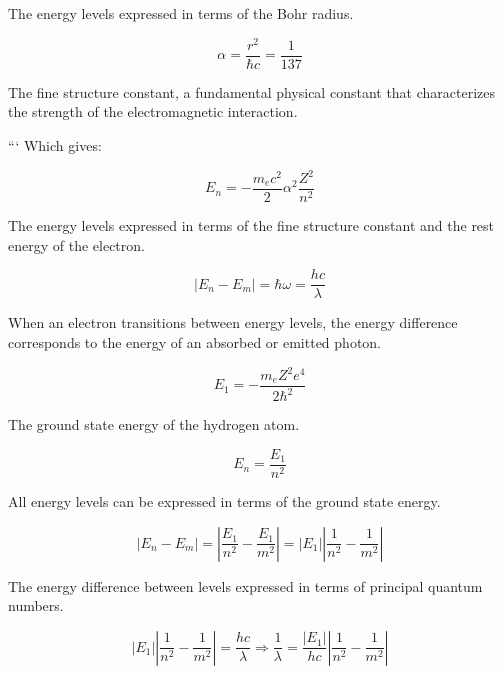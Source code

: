 \documentclass[10pt]{article}
\begin{document}
The energy levels expressed in terms of the Bohr radius.

\begin{equation*}
\alpha=\frac{r^{2}}{\hbar c}=\frac{1}{137} \tag{9.87}
\end{equation*}

The fine structure constant, a fundamental physical constant that characterizes the strength of the electromagnetic interaction.

```
Which gives:

\begin{equation*}
E_{n}=-\frac{m_{e} c^{2}}{2} \alpha^{2} \frac{Z^{2}}{n^{2}} \tag{9.88}
\end{equation*}

The energy levels expressed in terms of the fine structure constant and the rest energy of the electron.

\begin{equation*}
\left|E_{n}-E_{m}\right|=\hbar \omega=\frac{h c}{\lambda} \tag{9.89}
\end{equation*}

When an electron transitions between energy levels, the energy difference corresponds to the energy of an absorbed or emitted photon.

\begin{equation*}
E_{1}=-\frac{m_{e} Z^{2} e^{4}}{2 \hbar^{2}} \tag{9.90}
\end{equation*}

The ground state energy of the hydrogen atom.

\begin{equation*}
E_{n}=\frac{E_{1}}{n^{2}} \tag{9.91}
\end{equation*}

All energy levels can be expressed in terms of the ground state energy.

\begin{equation*}
\left|E_{n}-E_{m}\right|=\left|\frac{E_{1}}{n^{2}}-\frac{E_{1}}{m^{2}}\right|=\left|E_{1}\right|\left|\frac{1}{n^{2}}-\frac{1}{m^{2}}\right| \tag{9.92}
\end{equation*}

The energy difference between levels expressed in terms of principal quantum numbers.

\begin{equation*}
\left|E_{1}\right|\left|\frac{1}{n^{2}}-\frac{1}{m^{2}}\right|=\frac{h c}{\lambda} \Longrightarrow \frac{1}{\lambda}=\frac{\left|E_{1}\right|}{h c}\left|\frac{1}{n^{2}}-\frac{1}{m^{2}}\right| \tag{9.93}
\end{equation*}
\end{document}
